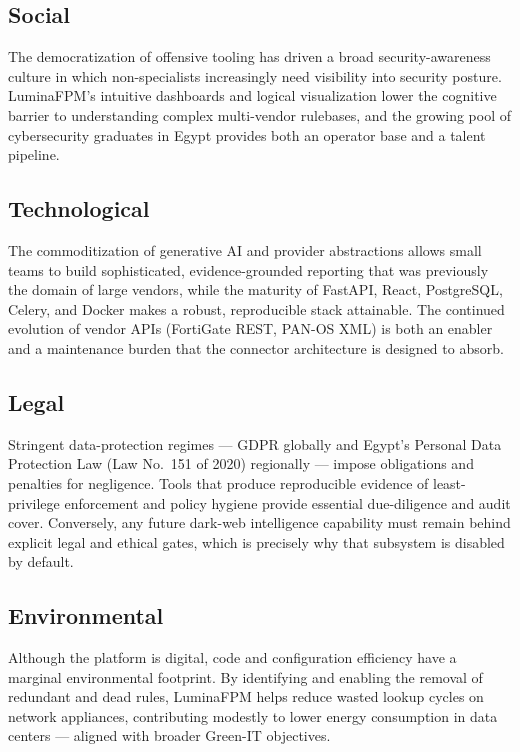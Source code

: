 \documentclass[12pt,a4paper]{report}
\renewcommand{\_}{\textunderscore\allowbreak}
\begin{document}
\subsection{Social}
The democratization of offensive tooling has driven a broad security-awareness culture in which non-specialists increasingly need visibility into security posture. LuminaFPM's intuitive dashboards and logical visualization lower the cognitive barrier to understanding complex multi-vendor rulebases, and the growing pool of cybersecurity graduates in Egypt provides both an operator base and a talent pipeline.

\subsection{Technological}
The commoditization of generative AI and provider abstractions allows small teams to build sophisticated, evidence-grounded reporting that was previously the domain of large vendors, while the maturity of FastAPI, React, PostgreSQL, Celery, and Docker makes a robust, reproducible stack attainable. The continued evolution of vendor APIs (FortiGate REST, PAN-OS XML) is both an enabler and a maintenance burden that the connector architecture is designed to absorb.

\subsection{Legal}
Stringent data-protection regimes --- GDPR globally and Egypt's Personal Data Protection Law (Law No.~151 of 2020) regionally --- impose obligations and penalties for negligence. Tools that produce reproducible evidence of least-privilege enforcement and policy hygiene provide essential due-diligence and audit cover. Conversely, any future dark-web intelligence capability must remain behind explicit legal and ethical gates, which is precisely why that subsystem is disabled by default.

\subsection{Environmental}
Although the platform is digital, code and configuration efficiency have a marginal environmental footprint. By identifying and enabling the removal of redundant and dead rules, LuminaFPM helps reduce wasted lookup cycles on network appliances, contributing modestly to lower energy consumption in data centers --- aligned with broader Green-IT objectives.
\end{document}
